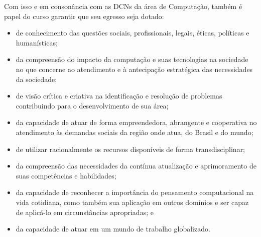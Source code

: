 Com isso e em consonância com as DCNs da área de Computação, também é papel do curso garantir que seu egresso seja dotado:

\begin{itemize}
	\item de conhecimento das questões sociais, profissionais, legais, éticas, políticas e humanísticas;
	\item da compreensão do impacto da computação e suas tecnologias na sociedade no que concerne ao atendimento e à antecipação estratégica das necessidades da sociedade;
	\item de visão crítica e criativa na identificação e resolução de problemas contribuindo para o desenvolvimento de sua área;
	\item da capacidade de atuar de forma empreendedora, abrangente e cooperativa no atendimento às demandas sociais da região onde atua, do Brasil e do mundo;
	\item de utilizar racionalmente os recursos disponíveis de forma transdisciplinar;
	\item da compreensão das necessidades da contínua atualização e aprimoramento de suas competências e habilidades;
	\item da capacidade de reconhecer a importância do pensamento computacional na vida cotidiana, como também sua aplicação em outros domínios e ser capaz de aplicá-lo em circunstâncias apropriadas; e
	\item da capacidade de atuar em um mundo de trabalho globalizado.
	
\end{itemize}

